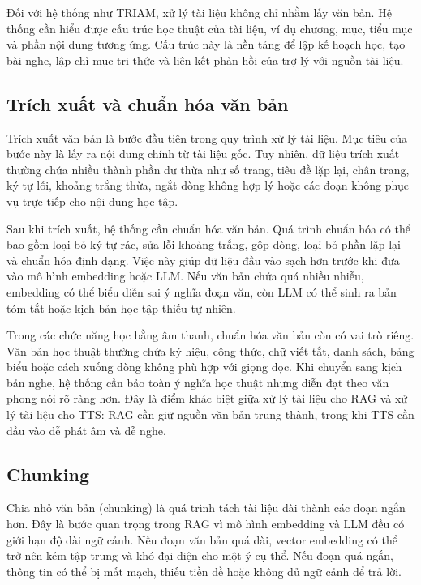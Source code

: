 \documentclass[12pt,a4paper]{report}
\begin{document}
Đối với hệ thống như TRIAM, xử lý tài liệu không chỉ nhằm lấy văn bản. Hệ thống cần hiểu được cấu trúc học thuật của tài liệu, ví dụ chương, mục, tiểu mục và phần nội dung tương ứng. Cấu trúc này là nền tảng để lập kế hoạch học, tạo bài nghe, lập chỉ mục tri thức và liên kết phản hồi của trợ lý với nguồn tài liệu.

\subsection{Trích xuất và chuẩn hóa văn bản}

Trích xuất văn bản là bước đầu tiên trong quy trình xử lý tài liệu. Mục tiêu của bước này là lấy ra nội dung chính từ tài liệu gốc. Tuy nhiên, dữ liệu trích xuất thường chứa nhiều thành phần dư thừa như số trang, tiêu đề lặp lại, chân trang, ký tự lỗi, khoảng trắng thừa, ngắt dòng không hợp lý hoặc các đoạn không phục vụ trực tiếp cho nội dung học tập.

Sau khi trích xuất, hệ thống cần chuẩn hóa văn bản. Quá trình chuẩn hóa có thể bao gồm loại bỏ ký tự rác, sửa lỗi khoảng trắng, gộp dòng, loại bỏ phần lặp lại và chuẩn hóa định dạng. Việc này giúp dữ liệu đầu vào sạch hơn trước khi đưa vào mô hình embedding hoặc LLM. Nếu văn bản chứa quá nhiều nhiễu, embedding có thể biểu diễn sai ý nghĩa đoạn văn, còn LLM có thể sinh ra bản tóm tắt hoặc kịch bản học tập thiếu tự nhiên.

Trong các chức năng học bằng âm thanh, chuẩn hóa văn bản còn có vai trò riêng. Văn bản học thuật thường chứa ký hiệu, công thức, chữ viết tắt, danh sách, bảng biểu hoặc cách xuống dòng không phù hợp với giọng đọc. Khi chuyển sang kịch bản nghe, hệ thống cần bảo toàn ý nghĩa học thuật nhưng diễn đạt theo văn phong nói rõ ràng hơn. Đây là điểm khác biệt giữa xử lý tài liệu cho RAG và xử lý tài liệu cho TTS: RAG cần giữ nguồn văn bản trung thành, trong khi TTS cần đầu vào dễ phát âm và dễ nghe.

\subsection{Chunking}

Chia nhỏ văn bản (chunking) là quá trình tách tài liệu dài thành các đoạn ngắn hơn. Đây là bước quan trọng trong RAG vì mô hình embedding và LLM đều có giới hạn độ dài ngữ cảnh. Nếu đoạn văn bản quá dài, vector embedding có thể trở nên kém tập trung và khó đại diện cho một ý cụ thể. Nếu đoạn quá ngắn, thông tin có thể bị mất mạch, thiếu tiền đề hoặc không đủ ngữ cảnh để trả lời.
\end{document}
